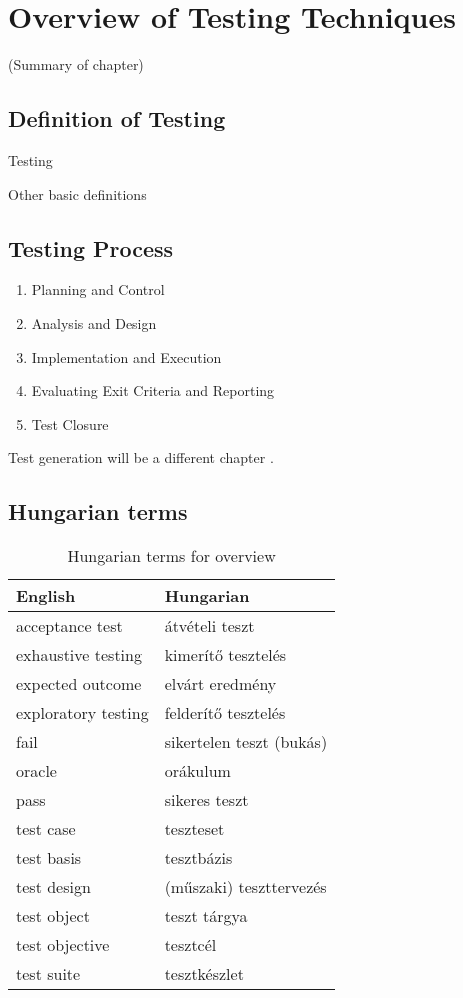 \chapter{Overview of Testing Techniques}
\label{cha:overview-of-testing}

(Summary of chapter)

\section{Definition of Testing}
\label{sec:definition-of-testing}

Testing \cite{myers-1979}

Other basic definitions

\section{Testing Process}
\label{sec:testing-process}

\begin{enumerate}
    \item Planning and Control
    \item Analysis and Design
    \item Implementation and Execution
    \item Evaluating Exit Criteria and Reporting    
    \item Test Closure
\end{enumerate}

Test generation will be a different chapter \cite{Anand13}.


\section{Hungarian terms}

\begin{table}
    \centering
    \small
    \caption{Hungarian terms for overview}
    \begin{tabular}{ll}
        \toprule
        \textbf{English} & \textbf{Hungarian} \\
        \midrule
        acceptance test & átvételi teszt \\
        exhaustive testing & kimerítő tesztelés \\
        expected outcome & elvárt eredmény \\
        exploratory testing & felderítő tesztelés \\
        fail & sikertelen teszt (bukás) \\
        oracle & orákulum \\
        pass & sikeres teszt \\
        test case & teszteset \\
        test basis & tesztbázis \\
        test design & (műszaki) teszttervezés \\
        test object & teszt tárgya \\
        test objective & tesztcél \\
        test suite & tesztkészlet \\
        \bottomrule
    \end{tabular}
    \label{tab:overview:hungarian-terms-testing-overview}
\end{table} 